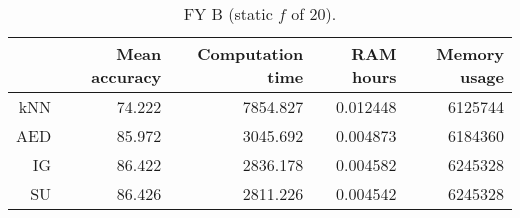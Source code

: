 \begin{table}[h]
\centering
\begin{tabular}{r|rrrr}
    & Mean accuracy & Computation time & RAM hours & Memory usage \\ \hline
kNN & 74.222                   & 7854.827         & 0.012448  & 6125744      \\
AED & 85.972                   & 3045.692         & 0.004873  & 6184360      \\
IG  & 86.422                   & 2836.178         & 0.004582  & 6245328      \\
SU  & 86.426                   & 2811.226         & 0.004542  & 6245328     
\end{tabular}
\caption{FY B (static $f$ of 20).}
\label{Table:FY_B}
\end{table}